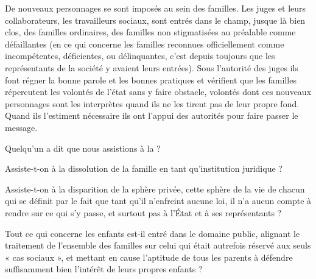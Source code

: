 De nouveaux personnages se sont imposés au sein des familles. Les juges et leurs collaborateurs, les travailleurs sociaux, sont entrés dans le champ, jusque là bien clos, des familles ordinaires, des familles non stigmatisées au préalable comme défaillantes (en ce qui concerne les familles reconnues officiellement comme incompétentes, déficientes, ou délinquantes, c'est depuis toujours que les représentants de la société y avaient leurs entrées). Sous l'autorité des juges ils font régner la bonne parole et les bonnes pratiques et vérifient que les familles répercutent les volontés de l'état sans y faire obstacle, volontés dont ces nouveaux personnages sont les interprètes quand ils ne les tirent pas de leur propre fond. Quand ils l'estiment nécessaire ils ont l'appui des autorités pour faire passer le message.

Quelqu'un a dit que nous assistions à la  ? 



 

 Assiste-t-on à la dissolution de la famille en tant qu'institution juridique ? 

 Assiste-t-on à la disparition de la sphère privée, cette sphère de la vie de chacun qui se définit par le fait que tant qu'il n'enfreint aucune loi, il n'a aucun compte à rendre sur ce qui s'y passe, et surtout pas à l'État et à ses représentants ? 

 Tout ce qui concerne les enfants est-il entré dans le domaine public, alignant le traitement de l'ensemble des familles sur celui qui était autrefois réservé aux seuls « cas sociaux », et mettant en cause l'aptitude de tous les parents à défendre suffisamment bien l'intérêt de leurs propres enfants ?



